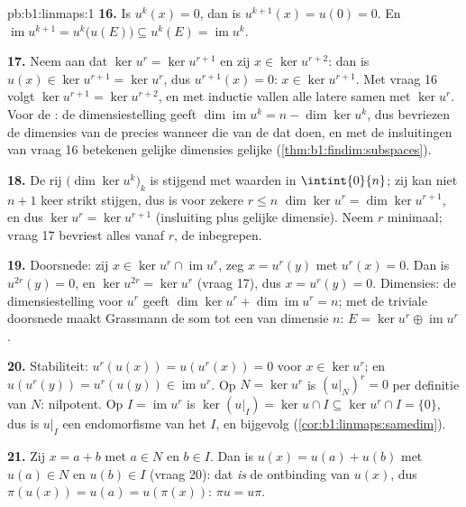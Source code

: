 \begin{solution}{pb:b1:linmaps:1}
\textbf{16.} Is $u^k(x) = 0$, dan is $u^{k+1}(x) = u(0) = 0$. En
$\operatorname{im} u^{k+1} = u^k\bigl(u(E)\bigr) \subseteq u^k(E) =
\operatorname{im} u^k$.

\textbf{17.} Neem aan dat $\ker u^{r} = \ker u^{r+1}$ en zij $x \in
\ker u^{r+2}$: dan is $u(x) \in \ker u^{r+1} = \ker u^{r}$, dus
$u^{r+1}(x) = 0$: $x \in \ker u^{r+1}$. Met vraag 16 volgt $\ker
u^{r+1} = \ker u^{r+2}$, en met inductie vallen alle latere 
samen met $\ker u^{r}$. Voor de : de dimensiestelling geeft
$\dim\operatorname{im} u^k = n - \dim\ker u^k$, dus bevriezen de
dimensies van de  precies wanneer die van de  dat
doen, en met de insluitingen van vraag 16 betekenen gelijke
dimensies gelijke 
(\cref{thm:b1:findim:subspaces}).

\textbf{18.} De rij $\bigl(\dim\ker u^k\bigr)_k$ is stijgend met
waarden in $\intint{0}{n}$; zij kan niet $n + 1$ keer strikt
stijgen, dus is voor zekere $r \leq n$ $\dim\ker u^{r} = \dim\ker
u^{r+1}$, en dus $\ker u^{r} = \ker u^{r+1}$ (insluiting plus
gelijke dimensie). Neem $r$ minimaal; vraag 17 bevriest alles vanaf
$r$, de  inbegrepen.

\textbf{19.} Doorsnede: zij $x \in \ker u^{r} \cap \operatorname{im}
u^{r}$, zeg $x = u^{r}(y)$ met $u^{r}(x) = 0$. Dan is $u^{2r}(y) =
0$, en $\ker u^{2r} = \ker u^{r}$ (vraag 17), dus $x = u^{r}(y) =
0$. Dimensies: de dimensiestelling voor $u^{r}$ geeft $\dim\ker
u^{r} + \dim\operatorname{im} u^{r} = n$; met de triviale doorsnede
maakt Grassmann de som tot een  van dimensie $n$: $E =
\ker u^{r} \oplus \operatorname{im} u^{r}$.

\textbf{20.} Stabiliteit: $u^{r}(u(x)) = u(u^{r}(x)) = 0$ voor $x
\in \ker u^{r}$; en $u(u^{r}(y)) = u^{r}(u(y)) \in
\operatorname{im} u^{r}$. Op $N = \ker u^{r}$ is $(u|_N)^{r} = 0$
per definitie van $N$: nilpotent. Op $I = \operatorname{im} u^{r}$
is $\ker(u|_I) = \ker u \cap I \subseteq \ker u^{r} \cap I =
\{0\}$, dus is $u|_I$ een  endomorfisme van het
 $I$, en bijgevolg 
(\cref{cor:b1:linmaps:samedim}).

\textbf{21.} Zij $x = a + b$ met $a \in N$ en $b \in I$. Dan is
$u(x) = u(a) + u(b)$ met $u(a) \in N$ en $u(b) \in I$ (vraag 20):
dat \emph{is} de ontbinding van $u(x)$, dus $\pi(u(x)) = u(a) =
u(\pi(x))$: $\pi u = u\pi$.


\end{solution}
